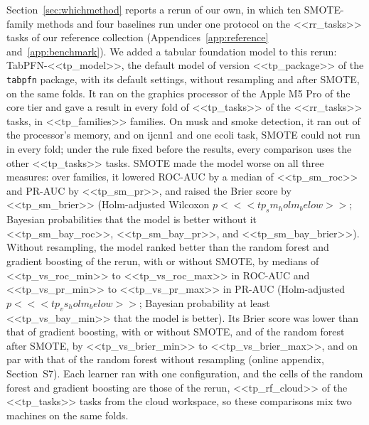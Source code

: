Section~\ref{sec:whichmethod} reports a rerun of our own, in which ten SMOTE-family methods and four baselines run under one protocol on the <<rr_tasks>> tasks of our reference collection (Appendices~\ref{app:reference} and~\ref{app:benchmark}). We added a tabular foundation model to this rerun: TabPFN-<<tp_model>>, the default model of version <<tp_package>> of the \texttt{tabpfn} package, with its default settings, without resampling and after SMOTE, on the same folds. It ran on the graphics processor of the Apple M5 Pro of the core tier and gave a result in every fold of <<tp_tasks>> of the <<rr_tasks>> tasks, in <<tp_families>> families. On musk and smoke detection, it ran out of the processor's memory, and on ijcnn1 and one ecoli task, SMOTE could not run in every fold; under the rule fixed before the results, every comparison uses the other <<tp_tasks>> tasks. SMOTE made the model worse on all three measures: over families, it lowered ROC-AUC by a median of <<tp_sm_roc>> and PR-AUC by <<tp_sm_pr>>, and raised the Brier score by <<tp_sm_brier>> (Holm-adjusted Wilcoxon $p < <<tp_sm_holm_below>>$; Bayesian probabilities that the model is better without it <<tp_sm_bay_roc>>, <<tp_sm_bay_pr>>, and <<tp_sm_bay_brier>>). Without resampling, the model ranked better than the random forest and gradient boosting of the rerun, with or without SMOTE, by medians of <<tp_vs_roc_min>> to <<tp_vs_roc_max>> in ROC-AUC and <<tp_vs_pr_min>> to <<tp_vs_pr_max>> in PR-AUC (Holm-adjusted $p < <<tp_vs_holm_below>>$; Bayesian probability at least <<tp_vs_bay_min>> that the model is better). Its Brier score was lower than that of gradient boosting, with or without SMOTE, and of the random forest after SMOTE, by <<tp_vs_brier_min>> to <<tp_vs_brier_max>>, and on par with that of the random forest without resampling (online appendix, Section~S7). Each learner ran with one configuration, and the cells of the random forest and gradient boosting are those of the rerun, <<tp_rf_cloud>> of the <<tp_tasks>> tasks from the cloud workspace, so these comparisons mix two machines on the same folds.
